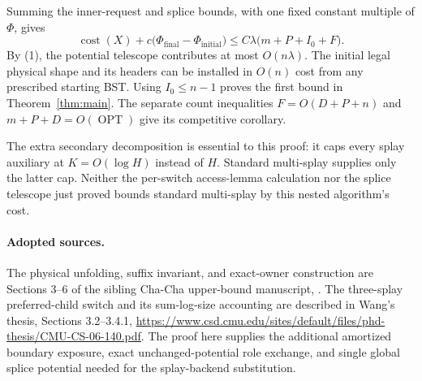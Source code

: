 \documentclass[11pt]{article}
\newcommand{\cost}{\operatorname{cost}}
\newcommand{\OPT}{\operatorname{OPT}}
\begin{document}
Summing the inner-request and splice bounds, with one fixed constant
multiple of $\Phi$, gives
\[
 \cost(X)+c\bigl(\Phi_{\mathrm{final}}-\Phi_{\mathrm{initial}}\bigr)
 \le C\lambda\bigl(m+P+I_0+F\bigr).
\]
By (1), the potential telescope contributes at most $O(n\lambda)$.
The initial legal physical shape and its headers can be installed in
$O(n)$ cost from any prescribed starting BST. Using $I_0\le n-1$
proves the first bound in Theorem~\ref{thm:main}. The separate count
inequalities $F=O(D+P+n)$ and $m+P+D=O(\OPT)$ give its competitive
corollary.

The extra secondary decomposition is essential to this proof: it caps
every splay auxiliary at $K=O(\log H)$ instead of $H$. Standard
multi-splay supplies only the latter cap. Neither the per-switch
access-lemma calculation nor the splice telescope just proved bounds
standard multi-splay by this nested algorithm's cost.

\paragraph{Adopted sources.}
The physical unfolding, suffix invariant, and exact-owner construction
are Sections 3--6 of the sibling Cha-Cha upper-bound manuscript,
.
The three-splay preferred-child switch and its sum-log-size accounting
are described in Wang's thesis, Sections 3.2--3.4.1,
\url{https://www.csd.cmu.edu/sites/default/files/phd-thesis/CMU-CS-06-140.pdf}.
The proof here supplies the additional amortized boundary exposure,
exact unchanged-potential role exchange, and single global splice
potential needed for the splay-backend substitution.
\end{document}
